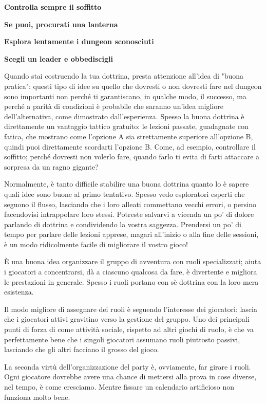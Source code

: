 \textbf{Controlla sempre il soffitto}

\textbf{Se puoi, procurati una lanterna}

\textbf{Esplora lentamente i dungeon sconosciuti}

\textbf{Scegli un leader e obbediscigli}

Quando stai costruendo la tua dottrina, presta attenzione all'idea di "buona pratica": questi tipo di idee su quello che dovresti o non dovresti fare nel dungeon sono importanti non perché ti garantiscano, in qualche modo, il successo, ma perché a parità di condizioni è probabile che saranno un'idea migliore dell'alternativa, come dimostrato dall'esperienza. Spesso la buona dottrina è direttamente un vantaggio tattico gratuito: le lezioni passate, guadagnate con fatica, che mostrano come l'opzione A sia strettamente superiore all'opzione B, quindi puoi direttamente scordarti l'opzione B. Come, ad esempio, controllare il soffitto; perché dovresti non volerlo fare, quando farlo ti evita di farti attaccare a sorpresa da un ragno gigante?

Normalmente, è tanto difficile stabilire una buona dottrina quanto lo è sapere quali idee sono buone al primo tentativo. Spesso vedo esploratori esperti che seguono il flusso, lasciando che i loro alleati commettano vecchi errori, o persino facendovisi intrappolare loro stessi. Potreste salvarvi a vicenda un po' di dolore parlando di dottrina e condividendo la vostra saggezza. Prendersi un po' di tempo per parlare delle lezioni apprese, magari all'inizio o alla fine delle sessioni, è un modo ridicolmente facile di migliorare il vostro gioco!




È una buona idea organizzare il gruppo di avventura con ruoli specializzati; aiuta i giocatori a concentrarsi, dà a ciascuno qualcosa da fare, è divertente e migliora le prestazioni in generale. Spesso i ruoli portano con sè dottrina con la loro mera esistenza.

Il modo migliore di assegnare dei ruoli è seguendo l'interesse dei giocatori: lascia che i giocatori attivi gravitino verso la gestione del gruppo. Uno dei principali punti di forza di \dnd come attività sociale, rispetto ad altri giochi di ruolo, è che va perfettamente bene che i singoli giocatori assumano ruoli piuttosto passivi, lasciando che gli altri facciano il grosso del gioco.

La seconda virtù dell'organizzazione del party è, ovviamente, far girare i ruoli. Ogni giocatore dovrebbe avere una chance di mettersi alla prova in cose diverse, nel tempo, è come cresciamo. Mentre fissare un calendario artificioso non funziona molto bene.

